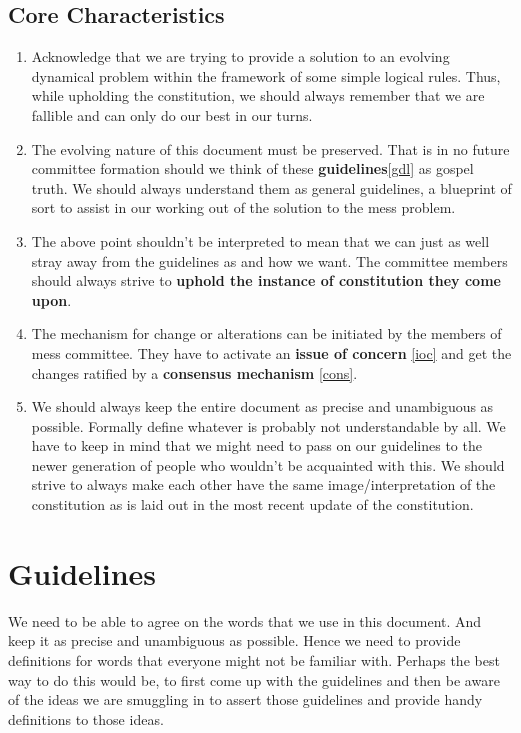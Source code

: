 \documentclass[12pt]{report}
\begin{document}
\section{Core Characteristics}
\begin{enumerate}
\item Acknowledge that we are trying to provide a solution to an evolving dynamical problem within the framework of some simple logical rules.  Thus, while upholding the constitution, we should always remember that we are fallible and can only do our best in our turns. 
\item  The evolving nature of this document must be preserved. That is in no future committee formation should we think of these \textbf{guidelines}\ref{gdl} as gospel truth. We should always understand them as general guidelines, a blueprint of sort to assist in our working out of the solution to the mess problem. 
\item The above point shouldn't be interpreted to mean that we can just as well stray away from the guidelines as and how we want. The committee members should always strive to \textbf{uphold the instance of constitution they come upon}. 
\item The mechanism for change or alterations can be initiated by the members of mess committee. They have to activate an \textbf{issue of concern} \ref{ioc} and get the changes ratified by a \textbf{consensus mechanism} \ref{cons}.
\item We should always keep the entire document as precise and unambiguous as possible. Formally define whatever is probably not understandable by all. We have to keep in mind that we might need to pass on our guidelines to the newer generation of people who wouldn't be acquainted with this. We should strive to always make each other have the same image/interpretation of the constitution as is laid out in the most recent update of the constitution.
\end{enumerate}

\chapter{Guidelines \label{gdl}}
We need to be able to agree on the words that we use in this document. And keep it as precise and unambiguous as possible. Hence we need to provide definitions for words that everyone might not be familiar with. Perhaps the best way to do this would be, to first come up with the guidelines and then be aware of the ideas we are smuggling in to assert those guidelines and provide handy definitions to those ideas. 
\end{document}
